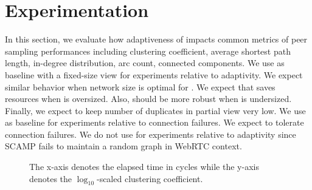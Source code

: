 \section{Experimentation}
\label{sec:experiments}

In this section, we evaluate how adaptiveness of \SPRAY impacts common metrics
of peer sampling performances including clustering coefficient, average
shortest path length, in-degree distribution, arc count, connected
components. We use \CYCLON as baseline with a fixed-size view for experiments
relative to adaptivity. We expect similar behavior when network size is optimal
for \CYCLON. We expect that \SPRAY saves resources when \CYCLON is oversized. Also, \SPRAY should be more robust when \CYCLON is undersized. Finally, we expect
\SPRAY to keep number of duplicates in partial view very low. We use \SCAMP as
baseline for experiments relative to connection failures. We expect \SPRAY to
tolerate connection failures.  We do not use \SCAMP for experiments relative to
adaptivity since SCAMP fails to maintain a random graph in WebRTC context.

\begin{figure}
  \centering
  \hspace{10pt}
  \caption{\label{fig:clustering}The x-axis denotes the elapsed time in cycles
    while the y-axis denotes the $\log_{10}$-scaled clustering coefficient.}
\end{figure}


